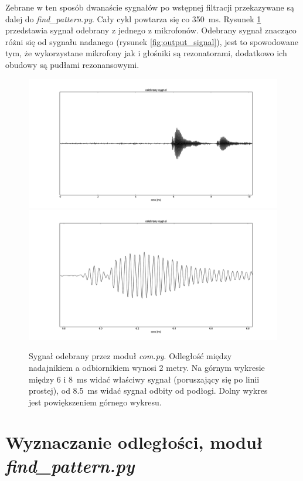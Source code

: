 Zebrane w ten sposób dwanaście sygnałów po wstępnej filtracji przekazywane są dalej do \textit{find\_pattern.py}. Cały cykl powtarza 
się co \SI{350}{ms}.
Rysunek \ref{fig:com_output_2m} przedstawia sygnał odebrany z jednego z mikrofonów.
Odebrany sygnał znacząco różni się od sygnału nadanego (rysunek \ref{fig:output_signal}),
jest to spowodowane tym, że wykorzystane mikrofony jak i głośniki są rezonatorami, dodatkowo 
ich obudowy są pudłami rezonansowymi.


\begin{figure}[h!]
    \centering
    \includegraphics[width=1.10\textwidth, trim= 53mm 0mm 0mm 0mm,clip]{com_output_2m_1}
    \includegraphics[width=1.10\textwidth, trim= 53mm 0mm 0mm 0mm,clip]{com_output_2m_2}
    \caption{Sygnał odebrany przez moduł \textit{com.py}. 
    Odległość między nadajnikiem a odbiornikiem wynosi 2 metry.
    Na górnym wykresie między 6 i \SI{8}{ms} widać właściwy sygnał (poruszający się po linii prostej), od \SI{8.5}{ms}
   widać sygnał odbity od podłogi. 
    Dolny wykres jest powiększeniem górnego wykresu.}
    \label{fig:com_output_2m}
\end{figure}

\section{Wyznaczanie odległości, moduł \textit{find\_pattern.py}}


